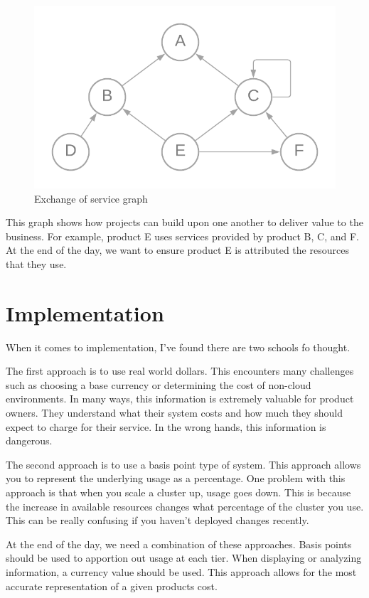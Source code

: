 \documentclass[10pt, a4paper, twocolumn]{article}
\begin{document}
    \begin{figure}[H]
      \centering
      \includegraphics[width=\linewidth]{./truth-and-reconciliation-graph.png}
      \caption{Exchange of service graph}
      \label{figure:2}
    \end{figure}

    This graph shows how projects can build upon one another to deliver value to the business.
    For example, product E uses services provided by product B, C, and F.
    At the end of the day, we want to ensure product E is attributed the resources that they use.

\section*{Implementation}
  When it comes to implementation, I've found there are two schools fo thought.

  The first approach is to use real world dollars.
  This encounters many challenges such as choosing a base currency or determining the cost of non-cloud environments.
  In many ways, this information is extremely valuable for product owners.
  They understand what their system costs and how much they should expect to charge for their service.
  In the wrong hands, this information is dangerous.

  The second approach is to use a basis point type of system.
  This approach allows you to represent the underlying usage as a percentage.
  One problem with this approach is that when you scale a cluster up, usage goes down.
  This is because the increase in available resources changes what percentage of the cluster you use.
  This can be really confusing if you haven't deployed changes recently.

  At the end of the day, we need a combination of these approaches.
  Basis points should be used to apportion out usage at each tier.
  When displaying or analyzing information, a currency value should be used.
  This approach allows for the most accurate representation of a given products cost.
\end{document}
